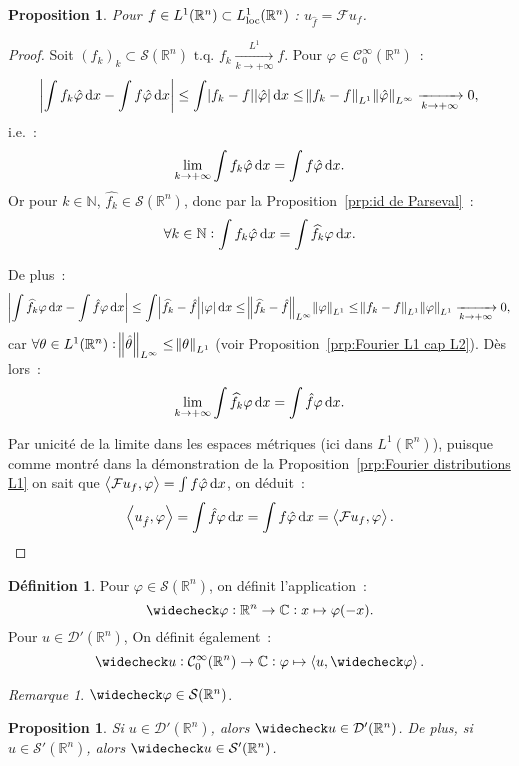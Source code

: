 \documentclass{report}
\newcommand{\C}{{\mathbb C}}
\newcommand{\R}{{\mathbb R}}
\newcommand{\N}{{\mathbb N}}
\newcommand{\scpr}[2]{\left\langle#1, #2\right\rangle}
\newcommand{\tq}{\text{ t.q. }}
\newcommand{\st}{\tq}
\newcommand{\pinfty}{{+\infty}}
\newcommand{\dx}{\dif x}
\newcommand{\loc}{{\text{\textnormal{loc}}}}
\newtheorem{prp}[thm]{Proposition}
\theoremstyle{definition}
\newtheorem{déf}[thm]{Définition}
\theoremstyle{remark}
\newtheorem*{rmq}{Remarque}
\begin{document}
\begin{prp} Pour $f \in L^1(\R^n) \subset L^1_\loc(\R^n)$ : $u_{\hat f} = \mathcal Fu_f$.
\end{prp}

\begin{proof} Soit $(f_k)_k \subset \mathcal S(\R^n) \st f_k \xrightarrow[k \to \pinfty]{L^1} f$. Pour $\varphi \in \mathcal C^\infty_0(\R^n)$~:
\[\abs {\int f_k\hat \varphi\dx - \int f\hat \varphi\dx} \leq \int\abs {f_k-f}\abs {\hat \varphi}\dx \leq \norm {f_k-f}_{L^1}\norm {\hat \varphi}_{L^\infty}
	\xrightarrow[k \to \pinfty]{} 0,\]
i.e.~:
\[\lim_{k \to \pinfty}\int f_k\hat\varphi\dx = \int f\hat\varphi\dx.\]
Or pour $k \in \N$, $\widehat {f_k} \in \mathcal S(\R^n)$, donc par la Proposition~\ref{prp:id de Parseval}~:
\[\forall k \in \N : \int f_k\hat\varphi\dx = \int \widehat {f_k}\varphi\dx.\]

De plus~:
\[\abs {\int \widehat {f_k}\varphi\dx - \int\hat f\varphi\dx} \leq \int \abs {\widehat {f_k} - \hat f}\abs \varphi\dx
\leq \norm {\widehat {f_k} - \hat f}_{L^\infty}\norm \varphi_{L^1} \leq \norm {f_k-f}_{L^1}\norm \varphi_{L^1} \xrightarrow[k \to \pinfty]{} 0,\]
car $\forall \theta \in L^1(\R^n) : \norm {\hat \theta}_{L^\infty} \leq \norm \theta_{L^1}$ (voir Proposition~\ref{prp:Fourier L1 cap L2}).
Dès lors~:
\[\lim_{k \to \pinfty}\int \widehat {f_k}\varphi\dx = \int\hat f\varphi\dx.\]

Par unicité de la limite dans les espaces métriques (ici dans $L^1(\R^n)$), puisque comme montré dans la démonstration de la Proposition~\ref{prp:Fourier distributions L1}
on sait que $\scpr {\mathcal Fu_f}\varphi = \int f\hat\varphi\dx$, on déduit~:
\[\scpr {u_{\hat f}}\varphi = \int\hat f\varphi\dx = \int f\hat \varphi\dx = \scpr {\mathcal Fu_f}\varphi.\]
\end{proof}

\begin{déf} Pour $\varphi \in \mathcal S(\R^n)$, on définit l'application~:
\[\widecheck \varphi : \R^n \to \C : x \mapsto \varphi(-x).\]
Pour $u \in \mathcal D'(\R^n)$, On définit également~:
\[\widecheck u : \mathcal C^\infty_0(\R^n) \to \C : \varphi \mapsto \scpr u{\widecheck \varphi}.\]
\end{déf}

\begin{rmq} $\widecheck \varphi \in \mathcal S(\R^n)$.
\end{rmq}

\begin{prp} Si $u \in \mathcal D'(\R^n)$, alors $\widecheck u \in \mathcal D'(\R^n)$. De plus, si $u \in \mathcal S'(\R^n)$, alors $\widecheck u \in \mathcal S'(\R^n)$.
\end{prp}
\end{document}
